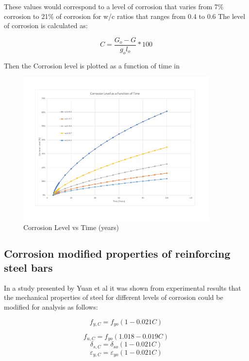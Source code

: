 These values would correspond to a level of corrosion that varies from 7\% corrosion to 21\% of corrosion for w/c ratios that ranges from 0.4 to 0.6
The level of corrosion is calculated as:

\begin{equation}
  C=\frac{G_o-G}{g_ol_o} *100%
  \label{eq.ten}
\end{equation} 

Then the Corrosion level is plotted as a function of time in 

\begin{figure}[htbp]
\centering
\includegraphics[width=0.9\textwidth]{Chapter-4/figs/CorrosionLevel}
\caption{Corrosion Level vs Time (years)}
\label{fig:hist3}
\end{figure}

\subsection{Corrosion modified properties of reinforcing steel bars}


In a study presented by Yuan et al \cite{Yuan2017a} it was shown from experimental results that the mechanical properties of steel for different levels of corrosion could be modified for analysis as follows:

\begin{equation}
  f_{y,C}=f_{yo}(1-0.021C)
  \label{eq.eleven}
\end{equation} 

\[
  f_{u,C}=f_{yo}(1.018-0.019C)
\]
\[
  \delta_{s,C}=\delta_{so}(1-0.021C)
\]
\[
  \varepsilon_{y,C}=\varepsilon_{yo}(1-0.021C)
\]

